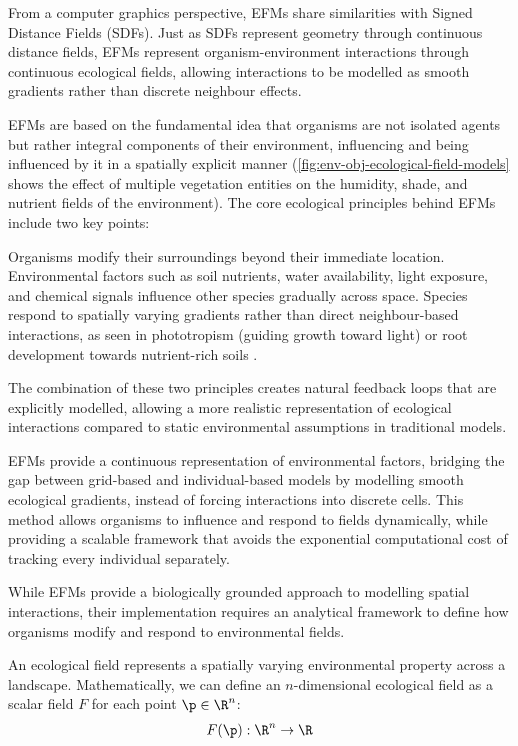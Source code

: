 From a computer graphics perspective, EFMs share similarities with Signed Distance Fields (SDFs). Just as SDFs represent geometry through continuous distance fields, EFMs represent organism-environment interactions through continuous ecological fields, allowing interactions to be modelled as smooth gradients rather than discrete neighbour effects.

EFMs are based on the fundamental idea that organisms are not isolated agents but rather integral components of their environment, influencing and being influenced by it in a spatially explicit manner (\cref{fig:env-obj-ecological-field-models} shows the effect of multiple vegetation entities on the humidity, shade, and nutrient fields of the environment). The core ecological principles behind EFMs include two key points:
\begin{Itemize}
     Organisms modify their surroundings beyond their immediate location. Environmental factors such as soil nutrients, water availability, light exposure, and chemical signals influence other species gradually across space.
     Species respond to spatially varying gradients rather than direct neighbour-based interactions, as seen in phototropism (guiding growth toward light) \cite{Pirk2012} or root development towards nutrient-rich soils \cite{Li2023}.
\end{Itemize}

The combination of these two principles creates natural feedback loops that are explicitly modelled, allowing a more realistic representation of ecological interactions compared to static environmental assumptions in traditional models.

EFMs provide a continuous representation of environmental factors, bridging the gap between grid-based and individual-based models by modelling smooth ecological gradients, instead of forcing interactions into discrete cells. This method allows organisms to influence and respond to fields dynamically, while providing a scalable framework that avoids the exponential computational cost of tracking every individual separately.

While EFMs provide a biologically grounded approach to modelling spatial interactions, their implementation requires an analytical framework to define how organisms modify and respond to environmental fields.





An ecological field represents a spatially varying environmental property across a landscape. Mathematically, we can define an $n$-dimensional ecological field as a scalar field $F$ for each point $\p \in \R^n$:
\begin{align}
    F(\p) : \R^n \to \R
\end{align}

